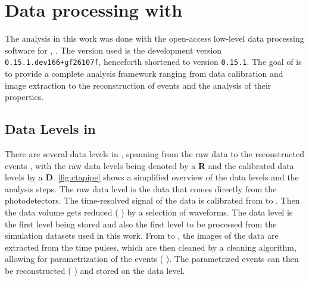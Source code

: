 \chapter{Data processing with \ctapipe{}}
\label{ch:data-processing}

The analysis in this work was done with the open-access low-level data processing software for \cta{},
\ctapipe{} \cite{ctapipe}. The version used is the development version \texttt{0.15.1.dev166+gf26107f},
henceforth shortened to version \texttt{0.15.1}. The goal of \ctapipe{} is to provide a complete analysis
framework ranging from data calibration and image extraction to the reconstruction of events and the
analysis of their properties.

\section{Data Levels in \ctapipe{}}
\label{sec:data-levels}

There are several data levels in \ctapipe{}, spanning from the raw data \rzero{} to the reconstructed events
\dlt{}, with the raw data levels being denoted by a \textbf{R} and the calibrated data levels by a \textbf{D}.
\autoref{fig:ctapipe} shows a simplified overview of the data levels and the analysis steps.
The raw data level \rzero{} is the data that comes directly from the photodetectors. The time-resolved
signal of the data is calibrated from \rzero{} to \rone{}. Then the data volume gets reduced
(\rone{} \rightarrow \dlz{}) by a selection of waveforms. The \dlz{} data level is the first level being
stored and also the first level to be processed from the simulation datasets used in this work.
From \dlz{} to \dloa{}, the images of the data are extracted from the time pulses, which are then
cleaned by a cleaning algorithm, allowing for parametrization of the events (\dloa{} \rightarrow \dlob{}).
The parametrized events can then be reconstructed (\dlob{} \rightarrow \dlt{}) and stored on the \dlt{} data level.

